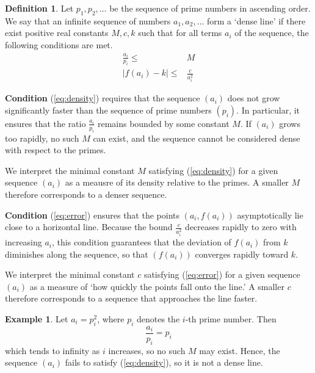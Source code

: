 \documentclass[a4paper, 12pt]{article}
\theoremstyle{definition}
\newtheorem{definition}{Definition}
\newtheorem{example}{Example}
\begin{document}
\begin{definition}\label{def:denseline}
  Let $p_1, p_2, \dots$ be the sequence of prime numbers in ascending order.
  We say that an infinite sequence of numbers 
  $a_1, a_2, \dots$
  form a `dense line' if there exist positive real constants $M, c, k$ such that
  for all terms $a_i$ of the sequence, the following conditions are met.
  \begin{align}
    \frac{a_i}{p_i} \leq& M               \label{eq:density}\\
    |f(a_i)-k|      \leq& \frac{c}{a_i^2} \label{eq:error}
  \end{align}
\end{definition}

\textbf{Condition} (\ref{eq:density}) requires that the sequence $(a_i)$ does not grow significantly faster than the sequence of prime numbers $(p_i)$.
In particular, it ensures that the ratio $\frac{a_i}{p_i}$ remains bounded by some constant $M$.
If $(a_i)$ grows too rapidly, no such $M$ can exist, and the sequence cannot be considered dense with respect to the primes.

We interpret the minimal constant $M$ satisfying (\ref{eq:density}) for a given sequence $(a_i)$ as a meausre of its density relative to the primes.
A smaller $M$ therefore corresponds to a denser sequence.

\vspace{1em}\textbf{Condition} (\ref{eq:error}) ensures that the points $(a_i, f(a_i))$ asymptotically lie close to a horizontal line.
Because the bound $\frac{c}{a_i^2}$ decreases rapidly to zero with increasing $a_i$, this condition guarantees that the deviation of $f(a_i)$ from $k$ diminishes along the sequence,
so that $(f(a_i))$ converges rapidly toward $k$.

We interpret the minimal constant $c$ satisfying (\ref{eq:error}) for a given sequence $(a_i)$ as a measure of `how quickly the points fall onto the line.'
A smaller $c$ therefore corresponds to a sequence that approaches the line faster.

\vspace{1em}\begin{example}
  Let $a_i = p_i^2$, where $p_i$ denotes the $i$-th prime number.
  Then
  \[\frac{a_i}{p_i}=p_i\]
  which tends to infinity as $i$ increases, so no such $M$ may exist.
  Hence, the sequence $(a_i)$ fails to satisfy (\ref{eq:density}), so it is not a dense line.
\end{example}\vspace{1em}
\end{document}
